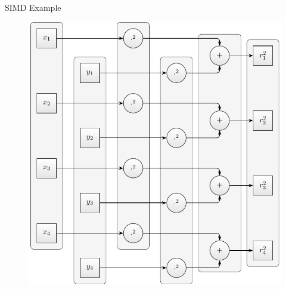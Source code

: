 \documentclass[aspectratio=169]{beamer}
\newcommand{\inputCodeBlock}[1]{%
    \begin{center}
        
    \end{center}
}
\begin{document}
    \begin{frame}{SIMD Example}
      \begin{figure}
        \includegraphics[scale=0.6]{figures/radius_operation_simd.pdf}
      \end{figure}
    \end{frame}

\end{document}
